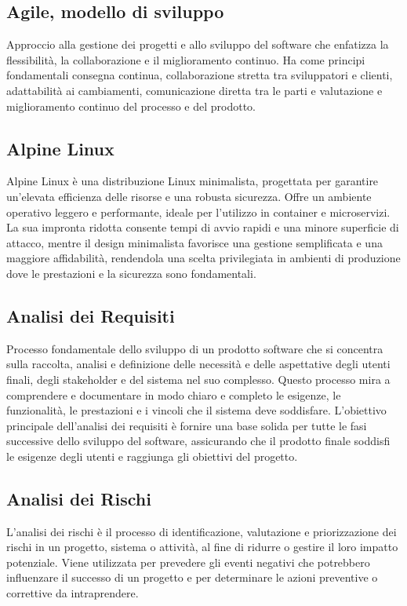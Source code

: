 \hypertarget{sec:modello_agile}{}
\subsection*{Agile, modello di sviluppo}
Approccio alla gestione dei progetti e allo sviluppo del software che enfatizza la flessibilità, la collaborazione e il miglioramento continuo. 
Ha come principi fondamentali consegna continua, collaborazione stretta tra sviluppatori e clienti, adattabilità ai cambiamenti, 
comunicazione diretta tra le parti e valutazione e miglioramento continuo del processo e del prodotto.

\hypertarget{sec:alpine_linux}{}
\subsection*{Alpine Linux}
Alpine Linux è una distribuzione Linux minimalista, progettata per garantire un'elevata efficienza delle risorse e una robusta sicurezza. 
Offre un ambiente operativo leggero e performante, ideale per l'utilizzo in container e microservizi. La sua 
impronta ridotta consente tempi di avvio rapidi e una minore superficie di attacco, mentre il design minimalista favorisce una gestione semplificata 
e una maggiore affidabilità, rendendola una scelta privilegiata in ambienti di produzione dove le prestazioni e la sicurezza sono fondamentali.

\subsection*{Analisi dei Requisiti}
Processo fondamentale dello sviluppo di un prodotto software che si concentra sulla raccolta, analisi e definizione delle necessità e delle aspettative 
degli utenti finali, degli stakeholder e del sistema nel suo complesso. Questo processo mira a comprendere e documentare in modo chiaro e completo le 
esigenze, le funzionalità, le prestazioni e i vincoli che il sistema deve soddisfare. L’obiettivo principale dell’analisi dei requisiti è fornire una 
base solida per tutte le fasi successive dello sviluppo del software, assicurando che il prodotto finale soddisfi le esigenze degli utenti e raggiunga 
gli obiettivi del progetto.

\subsection*{Analisi dei Rischi}
L'analisi dei rischi è il processo di identificazione, valutazione e priorizzazione dei rischi in un progetto, sistema o attività, al fine di ridurre 
o gestire il loro impatto potenziale. Viene utilizzata per prevedere gli eventi negativi che potrebbero influenzare il successo di un progetto e per 
determinare le azioni preventive o correttive da intraprendere.

